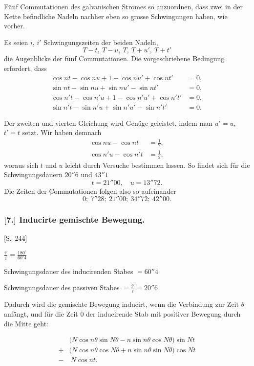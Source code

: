 \documentclass[12pt,a4paper]{article}
\begin{document}
F\"unf Commutationen des galvanischen Stromes so anzuordnen, dass zwei in der Kette befindliche Nadeln nachher eben so grosse Schwingungen haben, wie vorher.

Es seien $i$, $i'$ Schwingungszeiten der beiden Nadeln,
\[
T-t,\ T-u,\ T,\ T+u',\ T+t'
\]
die Augenblicke der f\"unf Commutationen. Die vorgeschriebene Bedingung erfordert, dass
\begin{align*}
\cos nt - \cos nu + 1 - \cos nu' + \cos nt' &= 0, \\
\sin nt - \sin nu + \sin nu' - \sin nt' &= 0, \\
\cos n't - \cos n'u + 1 - \cos n'u' + \cos n't' &= 0, \\
\sin n't - \sin n'u + \sin n'u' - \sin n't' &= 0.
\end{align*}

Der zweiten und vierten Gleichung wird Gen\"uge geleistet, indem man $u'=u$, $t'=t$ setzt. Wir haben demnach
\begin{align*}
\cos nu - \cos nt &= \tfrac12, \\
\cos n'u - \cos n't &= \tfrac12,
\end{align*}
woraus sich $t$ und $u$ leicht durch Versuche bestimmen lassen. So findet sich f\"ur die Schwingungsdauern $20''6$ und $43''1$
\[
t = 21''00, \quad u = 13''72.
\]
Die Zeiten der Commutationen folgen also so aufeinander
\[
0;\ 7''28;\ 21''00;\ 34''72;\ 42''00.
\]

\subsubsection*{[7.] Inducirte gemischte Bewegung.}

[S.~244]

$\frac{i'}{i} = \frac{180^\circ}{60^\circ 4}$

Schwingungsdauer des inducirenden Stabes $= 60''4$

Schwingungsdauer des passiven Stabes $= \frac{i'}{i} = 20''6$

\medskip\noindent
Dadurch wird die gemischte Bewegung inducirt, wenn die Verbindung zur Zeit $\theta$ anf\"angt, und f\"ur die Zeit $0$ der inducirende Stab mit positiver Bewegung durch die Mitte geht:

\begin{align*}
&\bigl(N\cos n\theta \sin N\theta - n\sin n\theta \cos N\theta\bigr) \sin Nt \\
+&\bigl(N\cos n\theta \cos N\theta + n\sin n\theta \sin N\theta\bigr) \cos Nt \\
-&\ N\cos nt.
\end{align*}
\end{document}
